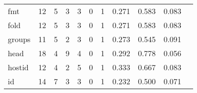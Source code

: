 \begin{longtable}{lp{1.2cm}p{1.2cm}p{1.2cm}p{1.2cm}p{1.2cm}p{1.2cm}p{1.2cm}p{1.2cm}p{1.2cm}p{1.2cm}}
fmt       &                                    12 &                                                  5 &                                                  3 &                                                  3 &                                                  0 &                                                  1 &                                         0.271 &                                              0.583 &                                              0.083 \\
fold      &                                    12 &                                                  5 &                                                  3 &                                                  3 &                                                  0 &                                                  1 &                                         0.271 &                                              0.583 &                                              0.083 \\
groups    &                                    11 &                                                  5 &                                                  2 &                                                  3 &                                                  0 &                                                  1 &                                         0.273 &                                              0.545 &                                              0.091 \\
head      &                                    18 &                                                  4 &                                                  9 &                                                  4 &                                                  0 &                                                  1 &                                         0.292 &                                              0.778 &                                              0.056 \\
hostid    &                                    12 &                                                  4 &                                                  2 &                                                  5 &                                                  0 &                                                  1 &                                         0.333 &                                              0.667 &                                              0.083 \\
id        &                                    14 &                                                  7 &                                                  3 &                                                  3 &                                                  0 &                                                  1 &                                         0.232 &                                              0.500 &                                              0.071 \\

\end{longtable}
